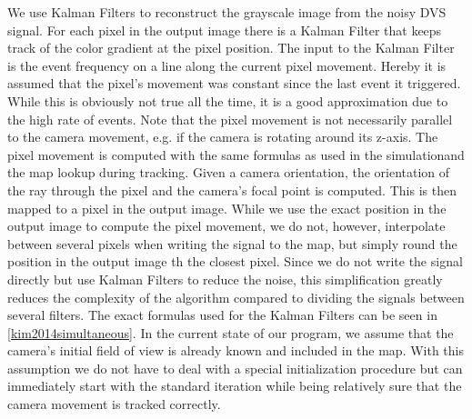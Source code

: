 We use Kalman Filters to reconstruct the grayscale image from the noisy DVS signal. For each pixel in the output image there is a Kalman Filter that keeps track of the color gradient at the pixel position. The input to the Kalman Filter is the event frequency on a line along the current pixel movement. Hereby it is assumed that the pixel's movement was constant since the last event it triggered. While this is obviously not true all the time, it is a good approximation due to the high rate of events. Note that the pixel movement is not necessarily parallel to the camera movement, e.g. if the camera is rotating around its z-axis.
The pixel movement is computed with the same formulas as used in the simulationand the map lookup during tracking. Given a camera orientation, the orientation of the ray through the pixel and the camera's focal point is computed. This is then mapped to a pixel in the output image. While we use the exact position in the output image to compute the pixel movement,  we do not, however, interpolate between several pixels when writing the signal to the map, but simply round the position in the output image th the closest pixel. Since we do not write the signal directly but use Kalman Filters to reduce the noise, this simplification greatly reduces the complexity of the algorithm compared to dividing the signals between several filters.
The exact formulas used for the Kalman Filters can be seen in \ref{kim2014simultaneous}.
In the current state of our program, we assume that the camera's initial field of view is already known and included in the map. With this assumption we do not have to deal with a special initialization procedure but can immediately start with the standard iteration while being relatively sure that the camera movement is tracked correctly.

